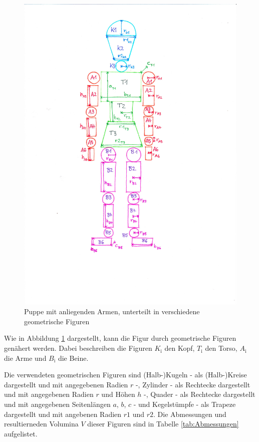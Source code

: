   \begin{figure}
    \centering
    \includegraphics[scale=0.8]{content/Igor.pdf}
    \caption{Puppe mit anliegenden Armen, unterteilt in verschiedene
    geometrische Figuren}
    \label{fig:Igor}
  \end{figure}

  Wie in Abbildung \ref{fig:Igor} dargestellt, kann die Figur durch geometrische Figuren
  genähert werden. Dabei beschreiben die Figuren $K_\text{i}$ den Kopf, $T_\text{i}$ 
  den Torso, $A_\text{i}$ die Arme und $B_\text{i}$ die Beine.
  
  Die verwendeten geometrischen Figuren sind 
  (Halb-)Kugeln - als (Halb-)Kreise dargestellt und mit angegebenen Radien $r$ -, 
  Zylinder - als Rechtecke dargestellt und mit angegebenen Radien $r$ und Höhen $h$ -, 
  Quader - als Rechtecke dargestellt und mit angegebenen Seitenlängen $a$, $b$, $c$ -
  und Kegelstümpfe - als Trapeze dargestellt und mit angebenen Radien $r1$ und $r2$. 
  Die Abmessungen und resultierneden Volumina $V$ dieser Figuren sind in Tabelle
  \ref{tab:Abmessungen} aufgelistet. \\

